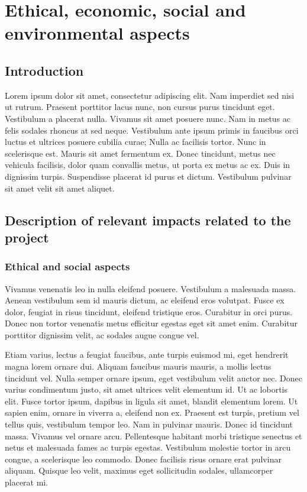 \chapter{Ethical, economic, social and environmental aspects} \label{app:econ_environ}
\section{Introduction}
Lorem ipsum dolor sit amet, consectetur adipiscing elit. Nam imperdiet sed nisi ut rutrum. Praesent porttitor lacus nunc, non cursus purus tincidunt eget. Vestibulum a placerat nulla. Vivamus sit amet posuere nunc. Nam in metus ac felis sodales rhoncus at sed neque. Vestibulum ante ipsum primis in faucibus orci luctus et ultrices posuere cubilia curae; Nulla ac facilisis tortor. Nunc in scelerisque est. Mauris sit amet fermentum ex. Donec tincidunt, metus nec vehicula facilisis, dolor quam convallis metus, ut porta ex metus ac ex. Duis in dignissim turpis. Suspendisse placerat id purus et dictum. Vestibulum pulvinar sit amet velit sit amet aliquet.

\section{Description of relevant impacts related to the project}
\subsection{Ethical and social aspects}

Vivamus venenatis leo in nulla eleifend posuere. Vestibulum a malesuada massa. Aenean vestibulum sem id mauris dictum, ac eleifend eros volutpat. Fusce ex dolor, feugiat in risus tincidunt, eleifend tristique eros. Curabitur in orci purus. Donec non tortor venenatis metus efficitur egestas eget sit amet enim. Curabitur porttitor dignissim velit, ac sodales augue congue vel.

Etiam varius, lectus a feugiat faucibus, ante turpis euismod mi, eget hendrerit magna lorem ornare dui. Aliquam faucibus mauris mauris, a mollis lectus tincidunt vel. Nulla semper ornare ipsum, eget vestibulum velit auctor nec. Donec varius condimentum justo, sit amet ultrices velit elementum id. Ut ac lobortis elit. Fusce tortor ipsum, dapibus in ligula sit amet, blandit elementum lorem. Ut sapien enim, ornare in viverra a, eleifend non ex. Praesent est turpis, pretium vel tellus quis, vestibulum tempor leo. Nam in pulvinar mauris. Donec id tincidunt massa. Vivamus vel ornare arcu. Pellentesque habitant morbi tristique senectus et netus et malesuada fames ac turpis egestas. Vestibulum molestie tortor in arcu congue, a scelerisque leo commodo. Donec facilisis risus ornare erat pulvinar aliquam. Quisque leo velit, maximus eget sollicitudin sodales, ullamcorper placerat mi.

